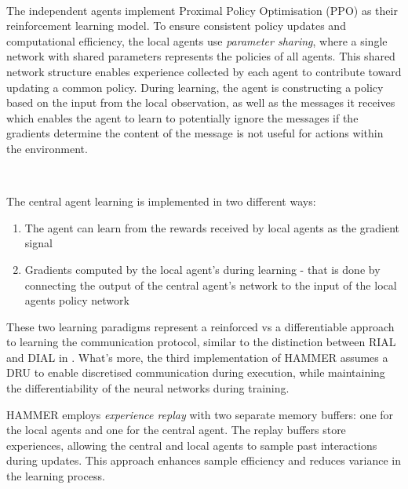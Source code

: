 \documentclass{article}
\begin{document}
\

The independent agents implement Proximal Policy Optimisation (PPO) \citep{schulman2017proximal} as their reinforcement learning model. To ensure consistent policy updates and computational efficiency, the local agents use \textit{parameter sharing}, where a single network with shared parameters represents the policies of all agents. This shared network structure enables experience collected by each agent to contribute toward updating a common policy. During learning, the agent is constructing a policy based on the input from the local observation, as well as the messages it receives which enables the agent to learn to potentially ignore the messages if the gradients determine the content of the message is not useful for actions within the environment. 

\

The central agent learning is implemented in two different ways:
\begin{enumerate}
    \item The agent can learn from the rewards received by local agents as the gradient signal
    \item Gradients computed by the local agent's during learning - that is done by connecting the output of the central agent's network to the input of the local agents policy network
\end{enumerate}

These two learning paradigms represent a reinforced vs a differentiable approach to learning the communication protocol, similar to the distinction between RIAL and DIAL in \citet{foerster2016learning}. What's more, the third implementation of HAMMER assumes a DRU to enable discretised communication during execution, while maintaining the differentiability of the neural networks during training.
\

HAMMER employs \textit{experience replay} with two separate memory buffers: one for the local agents and one for the central agent. The replay buffers store experiences, allowing the central and local agents to sample past interactions during updates. This approach enhances sample efficiency and reduces variance in the learning process.
\end{document}
